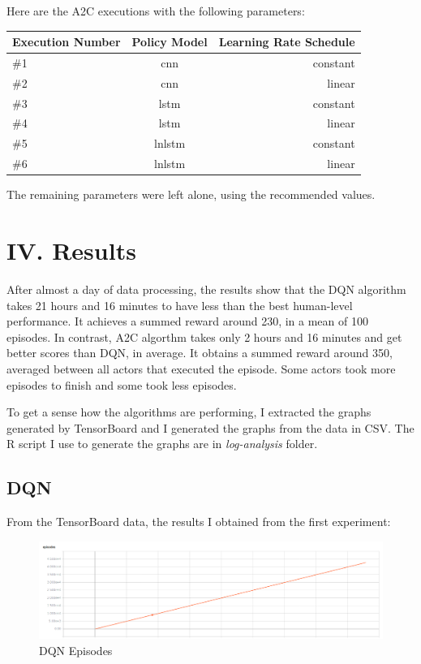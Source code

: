 \documentclass[11pt,twoside,a4paper]{article}
\begin{document}
Here are the A2C executions with the following parameters:

\begin{center}
  \begin{tabular}{ | l | c | r | }
    \hline
    \textbf{Execution Number} & \textbf{Policy Model} & \textbf{Learning Rate Schedule} \\ \hline
    \#1 & cnn & constant \\ \hline
    \#2 & cnn & linear \\ \hline
    \#3 & lstm & constant \\ \hline
    \#4 & lstm & linear \\ \hline
    \#5 & lnlstm & constant \\ \hline
    \#6 & lnlstm & linear \\
    \hline
  \end{tabular}
\end{center}

The remaining parameters were left alone, using the recommended values.

\section*{IV. Results}

After almost a day of data processing, the results show that the DQN algorithm
takes 21 hours and 16 minutes to have less than the best human-level
performance. It achieves a summed reward around 230, in a mean of 100 episodes.
In contrast, A2C algorthm takes only 2 hours and 16 minutes and get better
scores than DQN, in average. It obtains a summed reward around 350, averaged
between all actors that executed the episode. Some actors took more episodes to
finish and some took less episodes.

To get a sense how the algorithms are performing, I extracted the graphs
generated by TensorBoard and I generated the graphs from the data in CSV. The R
script I use to generate the graphs are in \emph{log-analysis} folder.

\subsection*{DQN}

From the TensorBoard data, the results I obtained from the first experiment:

\begin{figure}[H]
  \includegraphics[width=\linewidth]{images/graphs/dqn-episodes-clean.png}
  \caption{DQN Episodes}
  \label{fig:dqn-episodes}
\end{figure}
\end{document}

